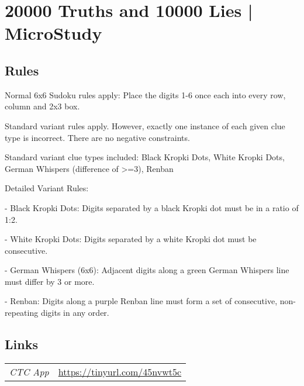 \section{20000 Truths and 10000 Lies | {\normalfont MicroStudy}}
\label{sec:41-20000-truths-and-10000-lies-microstudy}

\subsection*{Rules}
\begin{markdown}
Normal 6x6 Sudoku rules apply: Place the digits 1-6 once each into every row, column and 2x3 box.



Standard variant rules apply. However, exactly one instance of each given clue type is incorrect. There are no negative constraints.



Standard variant clue types included: Black Kropki Dots, White Kropki Dots, German Whispers (difference of >=3), Renban



Detailed Variant Rules:

- Black Kropki Dots: Digits separated by a black Kropki dot must be in a ratio of 1:2.

- White Kropki Dots: Digits separated by a white Kropki dot must be consecutive.

- German Whispers (6x6): Adjacent digits along a green German Whispers line must differ by 3 or more.

- Renban: Digits along a purple Renban line must form a set of consecutive, non-repeating digits in any order.
\end{markdown}
\subsection*{Links}
\begin{tabularx}{\textwidth}{l X}
\emph{CTC App} & \url{https://tinyurl.com/45nvwt5c} \\
\end{tabularx}
\pagebreak
